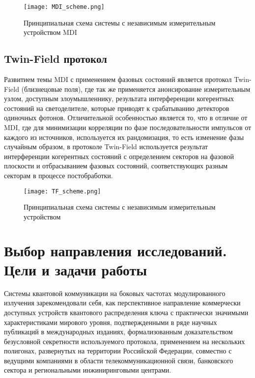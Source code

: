  \begin{figure}[ht]
  \centering
  \texttt{[image: MDI\_scheme.png]}
  \caption{Принципиальная схема системы с независимым измерительным устройством MDI}
  \label{fig:MDI_scheme}
\end{figure}


\subsection{Twin-Field протокол} \label{subsec:ch1/sec7/sub4}


Развитием темы MDI с применением фазовых состояний является протокол Twin-Field (близнецовые поля), где так же применяется анонсирование измерительным узлом, доступным злоумышленнику, результата интерференции когерентных состояний на светоделителе, которые приводят к срабатыванию детекторов одиночных фотонов. Отличительной особенностью является то, что в отличие от MDI, где для минимизации корреляции по фазе последовательности импульсов от каждого из источников, используется их рандомизация, то есть изменение фазы случайным образом, в протоколе Twin-Field используется результат интерференции когерентных состояний с определением секторов на фазовой плоскости и отбрасыванием фазовых состояний, соответствующих разным секторам в процессе постобработки.

 
 \begin{figure}[ht]
  \centering
  \texttt{[image: TF\_scheme.png]}
  \caption{Принципиальная схема системы с независимым измерительным устройством}
  \label{fig:TF_scheme}
\end{figure}

\section{Выбор направления исследований. Цели и задачи работы} \label{sec:ch1/sec8}

Системы квантовой коммуникации на боковых частотах модулированного излучения зарекомендовали себя, как перспективное направление коммерчески доступных устройств квантового распределения ключа с практически значимыми характеристиками мирового уровня, подтвержденными в ряде научных публикаций в международных изданиях, формализованным доказательством безусловной секретности используемого протокола, применением на нескольких полигонах, развернутых на территории Российской Федерации, совместно с ведущими компаниями в области телекоммуникационной связи, банковского сектора и региональными инжиниринговыми центрами. 


